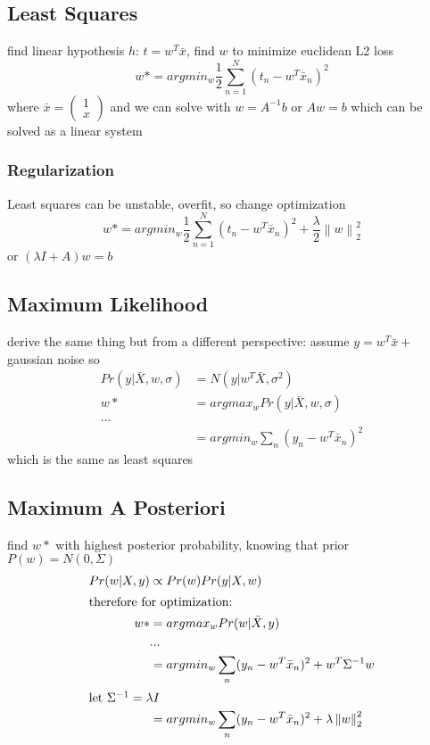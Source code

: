 \documentclass[]{article}
\theoremstyle{definition}
\newcommand\norm[1]{\left\lVert#1\right\rVert}
\begin{document}
    \subsection{Least Squares}
    \label{sub:introduction}

    find linear hypothesis $h$: $t = w^T \bar x$, find $w$ to minimize euclidean L2 loss
    \begin{equation*}
        w* = argmin_w \frac{1}{2} \sum_{n=1}^N (t_n - w^T \bar x_n)^2
    \end{equation*}
    where 
$ \bar x = \begin{pmatrix} 1 \\ x \end{pmatrix} $ and we can solve with $w = A^{-1} b$ or $Aw = b$ which can be solved as a linear system

    \subsubsection{Regularization}
    \label{ssub:Regularization}
    Least squares can be unstable, overfit, so change optimization
    \begin{equation*}
        w* = argmin_w \frac{1}{2} \sum_{n=1}^N (t_n - w^T \bar x_n)^2 + \frac{\lambda}{2} \norm{w}^2_2
    \end{equation*}
    or $(\lambda I + A)w = b$

    \subsection{Maximum Likelihood}
    \label{sub:maximum_likelihood}
    derive the same thing but from a different perspective: assume $y = w^T \bar x + $ gaussian noise so
    \begin{align*}
        Pr(y | \bar X, w, \sigma) &= N(y | w^T \bar X, \sigma^2) \\
        w* &= argmax_w Pr(y | \bar X, w, \sigma)  \\
            ... \\
           &= argmin_w \sum_n (y_n - w^T \bar x_n)^2 
    \end{align*}
    which is the same as least squares
    
    \subsection{Maximum A Posteriori}
    \label{sub:maximum_a_posteriori}

    find $w*$ with highest posterior probability, knowing that prior $P(w) = N(0, \Sigma)$
    \begin{align*}
        Pr(w|X,y) &\propto Pr(w) Pr(y | X, w) \\
        \intertext{therefore for optimization:}
        w* &= argmax_w Pr(w | \bar X, y) \\
           &... \\
           &= argmin_w \sum_n (y_n - w^T \bar x_n)^2 + w^T \Sigma^{-1} w \\
    \intertext{let $\Sigma^{-1} = \lambda I$}
           &= argmin_w \sum_n(y_n - w^T \bar x_n)^2 + \lambda \norm{w}^2_2 \\
    \end{align*}
    
\end{document}
